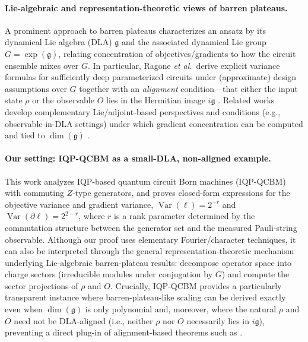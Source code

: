 \documentclass[a4paper,onecolumn,notitlepage,nofootinbib,longbibliography,superscriptaddress, floatfix, pra, aps, 10pt]{revtex4-2}
\begin{document}
\paragraph{Lie-algebraic and representation-theoretic views of barren plateaus.}
A prominent approach to barren plateaus characterizes an ansatz by its dynamical Lie algebra (DLA) $\mathfrak g$ and the associated dynamical Lie group $G=\exp(\mathfrak g)$, relating concentration of objectives/gradients to how the circuit ensemble mixes over $G$.
In particular, Ragone \emph{et al.}\ derive explicit variance formulas for sufficiently deep parameterized circuits under (approximate) design assumptions over $G$ together with an \emph{alignment} condition---that either the input state $\rho$ or the observable $O$ lies in the Hermitian image $i\mathfrak g$ \cite{RagoneNatComm2024}.
Related works develop complementary Lie/adjoint-based perspectives and conditions (e.g., observable-in-DLA settings) under which gradient concentration can be computed and tied to $\dim(\mathfrak g)$ \cite{FontanaAdjoint2309_07902, LaroccaQuantumControl2021}.

\paragraph{Our setting: IQP-QCBM as a small-DLA, non-aligned example.}
This work analyzes IQP-based quantum circuit Born machines (IQP-QCBM) with commuting $Z$-type generators, and proves closed-form expressions for the objective variance and gradient variance,
$\operatorname*{Var}(\ell)=2^{-r}$ and $\operatorname*{Var}(\partial \ell)=2^{2-r}$, where $r$ is a rank parameter determined by the commutation structure between the generator set and the measured Pauli-string observable.
Although our proof uses elementary Fourier/character techniques, it can also be interpreted through the general representation-theoretic mechanism underlying Lie-algebraic barren-plateau results: decompose operator space into charge sectors (irreducible modules under conjugation by $G$) and compute the sector projections of $\rho$ and $O$.
Crucially, IQP-QCBM provides a particularly transparent instance where barren-plateau-like scaling can be derived exactly even when $\dim(\mathfrak g)$ is only polynomial and, moreover, where the natural $\rho$ and $O$ need not be DLA-aligned (i.e., neither $\rho$ nor $O$ necessarily lies in $i\mathfrak g$), preventing a direct plug-in of alignment-based theorems such as \cite{RagoneNatComm2024}.
\end{document}
